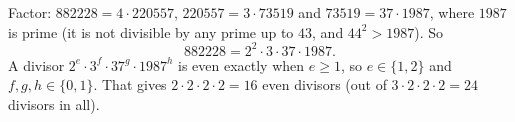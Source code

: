 Factor: $882228=4\cdot220557$, $220557=3\cdot73519$ and $73519=37\cdot1987$, where $1987$ is prime (it is not divisible by any prime up to $43$, and $44^2>1987$). So
\[
882228=2^2\cdot3\cdot37\cdot1987 .
\]
A divisor $2^e\cdot3^f\cdot37^g\cdot1987^h$ is even exactly when $e\ge1$, so $e\in\{1,2\}$ and $f,g,h\in\{0,1\}$. That gives $2\cdot2\cdot2\cdot2=\boxed{16}$ even divisors (out of $3\cdot2\cdot2\cdot2=24$ divisors in all).

